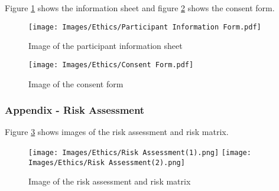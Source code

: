 \documentclass{IEEEtran}
\begin{document}
Figure \ref{fig:AppendixInfoForm} shows the information sheet and figure \ref{fig:AppendixConsentForm} shows the consent form.

\begin{figure}[!h]
  \centering
  \texttt{[image: Images/Ethics/Participant Information Form.pdf]}
  
\caption{Image of the participant information sheet}
\label{fig:AppendixInfoForm}
\end{figure}

\begin{figure}[!h]
  \centering
  \texttt{[image: Images/Ethics/Consent Form.pdf]}
  
\caption{Image of the consent form}
\label{fig:AppendixConsentForm}
\end{figure}

\clearpage

\subsubsection{Appendix - Risk Assessment}
\label{AppendixRiskAssessment}

Figure \ref{fig:AppendixRiskAssessment} shows images of the risk assessment and risk matrix.

\begin{figure}[!h]
  \centering
  \texttt{[image: Images/Ethics/Risk Assessment(1).png]}
  \texttt{[image: Images/Ethics/Risk Assessment(2).png]}
  
\caption{Image of the risk assessment and risk matrix}
\label{fig:AppendixRiskAssessment}
\end{figure}

\clearpage
\end{document}
